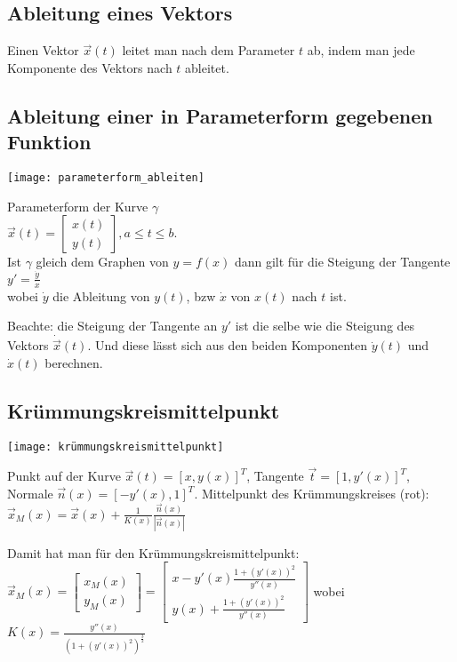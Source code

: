 \documentclass[../main.tex]{subfiles}
\begin{document}
\subsection{Ableitung eines Vektors}
Einen Vektor $\vec{x}(t)$ leitet man nach dem Parameter $t$ ab, indem man jede Komponente des Vektors nach $t$ ableitet.

\subsection{Ableitung einer in Parameterform gegebenen Funktion}
\begin{minipage}{0.5\textwidth}
    \texttt{[image: parameterform\_ableiten]}
\end{minipage} \hfill
\begin{minipage}{0.45\textwidth}
    Parameterform der Kurve $\gamma$ \\ [7pt]
    $\vec{x}(t)=\begin{bmatrix}
        x(t) \\
        y(t)
    \end{bmatrix}, a \le t \le b$. \\ [7pt]
    Ist $\gamma$ gleich dem Graphen von $y=f(x)$ dann gilt für die Steigung der Tangente \\ [7pt]
    $y'=\frac{\dot{y}}{\dot{x}}$ \\ [7pt]
    wobei $\dot{y}$ die Ableitung von $y(t)$, bzw $\dot{x}$ von $x(t)$ nach $t$ ist.
\end{minipage}

Beachte: die Steigung der Tangente an $y'$ ist die selbe wie die Steigung des Vektors $\dot{\vec{x}}(t)$. 
Und diese lässt sich aus den beiden Komponenten $\dot{y}(t)$ und $\dot{x}(t)$ berechnen.

\subsection{Krümmungskreismittelpunkt}
\begin{minipage}{0.5\textwidth}
    \texttt{[image: krümmungskreismittelpunkt]}
\end{minipage} \hfill
\begin{minipage}{0.45\textwidth}
    Punkt auf der Kurve $\vec{x}(t)=[x,y(x)]^T$, 
    Tangente $\vec{t}=[1,y'(x)]^T$,
    Normale $\vec{n}(x)=[-y'(x),1]^T$.
    Mittelpunkt des Krümmungskreises (rot): \\ [7pt]
    $\vec{x}_M(x) = \vec{x}(x) + \frac{1}{K(x)}\frac{\vec{n}(x)}{|\vec{n}(x)|}$
\end{minipage}
Damit hat man für den Krümmungskreismittelpunkt: \\ [7pt]
\begin{math}
\vec{x}_M(x)=
\begin{bmatrix}
    x_M(x) \\
    y_M(x)
\end{bmatrix} = 
\begin{bmatrix}
    x-y'(x)\frac{1+(y'(x))^2}{y''(x)} \\
    y(x)+\frac{1+(y'(x))^2}{y''(x)}
\end{bmatrix}
\end{math}
wobei $K(x) = \frac{y''(x)}{(1+(y'(x))^2)^{\frac{3}{2}}}$
\end{document}
